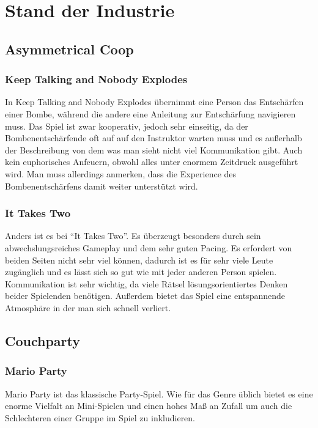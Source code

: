 \chapter{Stand der Industrie\label{_industrie}}

\section{Asymmetrical Coop}

\subsection{Keep Talking and Nobody Explodes}
In Keep Talking and Nobody Explodes übernimmt eine Person das Entschärfen einer Bombe, während die andere eine Anleitung zur Entschärfung navigieren muss. Das Spiel ist zwar kooperativ, jedoch sehr einseitig, da der Bombenentschärfende oft auf auf den Instruktor warten muss und es außerhalb der Beschreibung von dem was man sieht nicht viel Kommunikation gibt. Auch kein euphorisches Anfeuern, obwohl alles unter enormem Zeitdruck ausgeführt wird. Man muss allerdings anmerken, dass die Experience des Bombenentschärfens damit weiter unterstützt wird.

\subsection{It Takes Two}
Anders ist es bei "`It Takes Two"'. Es überzeugt besonders durch sein abwechslungsreiches Gameplay und dem sehr guten Pacing. Es erfordert von beiden Seiten nicht sehr viel können, dadurch ist es für sehr viele Leute zugänglich und es lässt sich so gut wie mit jeder anderen Person spielen. Kommunikation ist sehr wichtig, da viele Rätsel lösungsorientiertes Denken beider Spielenden benötigen. Außerdem bietet das Spiel eine entspannende Atmosphäre in der man sich schnell verliert.

\section{Couchparty}

\subsection{Mario Party}
Mario Party ist das klassische Party-Spiel. Wie für das Genre üblich bietet es eine enorme Vielfalt an Mini-Spielen und einen hohes Maß an Zufall um auch die Schlechteren einer Gruppe im Spiel zu inkludieren.

